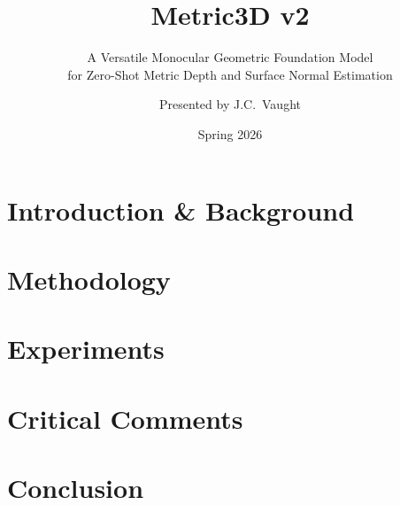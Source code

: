 \documentclass[aspectratio=169]{beamer}
\title{\textcolor{garnet}{\textbf{Metric3D v2}}}
\subtitle{A Versatile Monocular Geometric Foundation Model\\for Zero-Shot Metric Depth and Surface Normal Estimation}
\author{Presented by J.C.\ Vaught}
\institute{CSCE 763 --- Digital Image Processing\\University of South Carolina}
\date{Spring 2026}
\begin{document}


\section{Introduction \& Background}




\section{Methodology}









\section{Experiments}




\section{Critical Comments}



\section{Conclusion}

\end{document}
